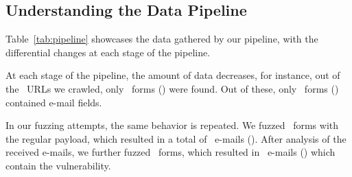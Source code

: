 \subsection[The Pipeline]{Understanding the Data Pipeline}
Table~\ref{tab:pipeline} showcases the data gathered by our pipeline, with the differential changes at each stage of the pipeline. 

At each stage of the pipeline, the amount of data decreases, for instance, out of the \urls\ URLs we crawled, only \forms\ forms (\formsDelta) were found. Out of these, only \emailforms\ forms (\emailformsDelta) contained e-mail fields.

In our fuzzing attempts, the same behavior is repeated. We fuzzed \fuzzed\ forms with the regular payload, which resulted in a total of \recd\ e-mails (\recdDelta). After analysis of the received e-mails, we further fuzzed \fuzzed\ forms, which resulted in \success\ e-mails (\successDelta) which contain the vulnerability.



